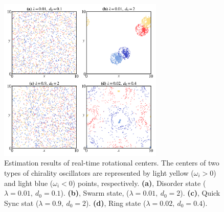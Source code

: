 \documentclass[%
 aip,
 amsmath,amssymb,
 reprint,%
]{revtex4-1}
\begin{document}
\begin{figure}
    \includegraphics[width=0.7\textwidth]{./figs/etimateCenter.png}
    \caption{
        \label{fig:etimateCenter} Estimation results of real-time rotational centers. 
        The centers of two types of chirality oscillators are represented by light yellow ($\omega_i > 0$) and light blue
        ($\omega_i < 0$) points, respectively.
        \textbf{(a)}, Disorder state ($\lambda=0.01,\ d_0=0.1$).
        \textbf{(b)}, Swarm state, ($\lambda=0.01,\ d_0=2$).
        \textbf{(c)}, Quick Sync stat ($\lambda=0.9,\ d_0=2$).
        \textbf{(d)}, Ring state ($\lambda=0.02,\ d_0=0.4$).
    }
\end{figure}

\nocite{*}

\end{document}
